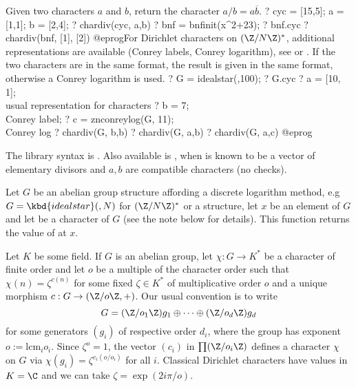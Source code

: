 Given two characters $a$ and $b$, return the character
$a / b = a \overline{b}$.
\bprog
? cyc = [15,5]; a = [1,1]; b =  [2,4];
? chardiv(cyc, a,b)
? bnf = bnfinit(x^2+23);
? bnf.cyc
? chardiv(bnf, [1], [2])
@eprog\noindent For Dirichlet characters on  $(\Z/N\Z)^*$, additional
representations are available (Conrey labels, Conrey logarithm),
see  or .
If the two characters are in the same format, the
result is given in the same format, otherwise a Conrey logarithm is used.
\bprog
? G = idealstar(,100);
? G.cyc
? a = [10, 1]; \\ usual representation for characters
? b = 7; \\ Conrey label;
? c = znconreylog(G, 11); \\ Conrey log
? chardiv(G, b,b)
? chardiv(G, a,b)
? chardiv(G, a,c)
@eprog

The library syntax is .
Also available is
, when  is known to
be a vector of elementary divisors and $a, b$ are compatible characters
(no checks).

\label{se:chareval}
Let $G$ be an abelian group structure affording a discrete logarithm
method, e.g $G = \kbd{idealstar}(,N)$ for $(\Z/N\Z)^*$ or a 
structure, let $x$ be an element of $G$ and let  be a character of
$G$ (see the note below for details). This function returns the value of
 at $x$.

Let $K$ be some field. If $G$ is an abelian group,
let $\chi: G \to K^*$ be a character of finite order and let $o$ be a
multiple of the character order such that $\chi(n) = \zeta^{c(n)}$ for some
fixed $\zeta\in K^*$ of multiplicative order $o$ and a unique morphism $c: G
\to (\Z/o\Z,+)$. Our usual convention is to write
$$G = (\Z/o_1\Z) g_1 \oplus \cdots \oplus (\Z/o_d\Z) g_d$$
for some generators $(g_i)$ of respective order $d_i$, where the group has
exponent $o := \text{lcm}_i o_i$. Since $\zeta^o = 1$, the vector $(c_i)$ in
$\prod (\Z/o_i\Z)$ defines a character $\chi$ on $G$ via $\chi(g_i) =
\zeta^{c_i (o/o_i)}$ for all $i$. Classical Dirichlet characters have values
in $K = \C$ and we can take $\zeta = \exp(2i\pi/o)$.

